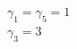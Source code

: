 \documentclass[preview]{standalone}
\begin{document}
\begin{center}
$\gamma_1 = \gamma_5 = 1$\\$\gamma_3 = 3$
\end{center}
\end{document}
